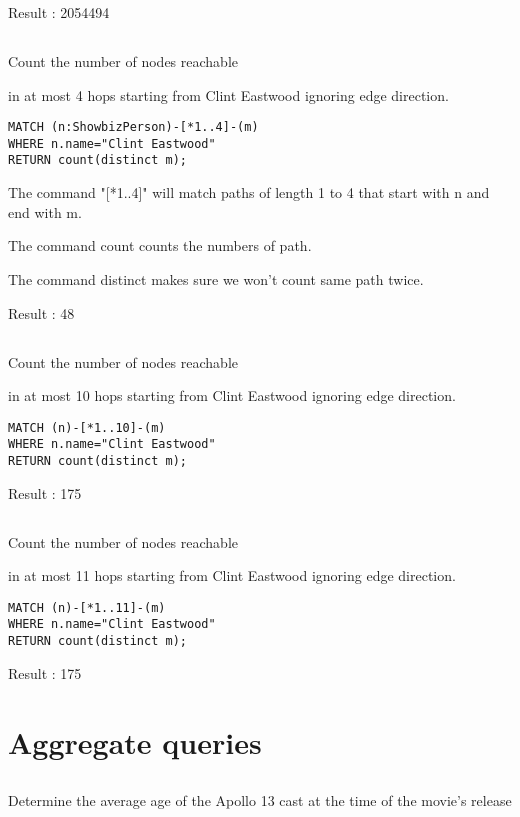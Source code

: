 Result : 2054494

\subsection{}
Count the number of nodes reachable

in at most 4 hops starting from Clint Eastwood ignoring edge direction.

\begin{verbatim}
MATCH (n:ShowbizPerson)-[*1..4]-(m)
WHERE n.name="Clint Eastwood"
RETURN count(distinct m);
\end{verbatim}

The command "[*1..4]" will match paths of length 1 to 4 that start with n and end with  m.

The command count counts the numbers of path.

The command distinct makes sure we won't count same path twice.

Result : 48

\subsection{}
Count the number of nodes reachable

in at most 10 hops starting from Clint Eastwood ignoring edge direction.

\begin{verbatim}
MATCH (n)-[*1..10]-(m)
WHERE n.name="Clint Eastwood"
RETURN count(distinct m);
\end{verbatim}

Result : 175

\subsection{}
Count the number of nodes reachable

in at most 11 hops starting from Clint Eastwood ignoring edge direction.

\begin{verbatim}
MATCH (n)-[*1..11]-(m)
WHERE n.name="Clint Eastwood"
RETURN count(distinct m);
\end{verbatim}

Result : 175

\section{Aggregate queries}
\subsection{}
Determine the average age of the Apollo 13 cast at the time of the movie’s release

